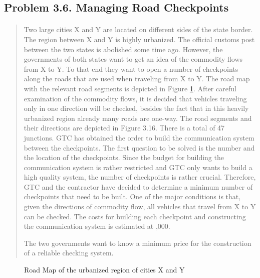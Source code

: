 \subsection{Problem 3.6. Managing Road Checkpoints}

\paragraph{}
\begin{quote}
Two large cities X and Y are located on different sides of the state border. The region between X and Y is highly urbanized. The official customs post between the two states is abolished some time ago. However, the governments of both states want to get an idea of the commodity flows from X to Y. To that end they want to open a number of checkpoints along the roads that are used when traveling from X to Y. The road map with the relevant road segments is depicted in Figure \ref{network3-6}. After careful examination of the commodity flows, it is decided that vehicles traveling only in one direction will be checked, besides the fact that in this heavily urbanized region already many roads are one-way. The road segments and their directions are depicted in Figure 3.16. There is a total of 47 junctions. GTC has obtained the order to build the communication system between the checkpoints. The first question to be solved is the number and the location of the checkpoints. Since the budget for building the communication system is rather restricted and GTC only wants to build a high quality system, the number of checkpoints is rather crucial. Therefore, GTC and the contractor have decided to determine a minimum number of checkpoints that need to be built. One of the major conditions is that, given the directions of commodity flow, all vehicles that travel from X to Y can be checked. The costs for building each checkpoint and constructing the communication system is estimated at ,000.

The two governments want to know a minimum price for the construction of a reliable checking system.
\end{quote}

\begin{figure}[H]
	\centering
	\caption{Road Map of the urbanized region of cities X and Y}
	\label{network3-6}
\end{figure}

